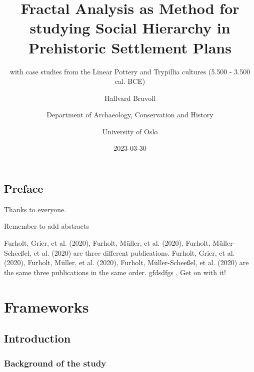 \documentclass[
  12pt,
]{book}
\title{Fractal Analysis as Method for studying Social Hierarchy in Prehistoric Settlement Plans}
\subtitle{with case studies from the Linear Pottery and Trypillia cultures (5.500 - 3.500 cal. BCE)}
\author{Hallvard Bruvoll \and Department of Archaeology, Conservation and History \and University of Oslo}
\date{2023-03-30}
\begin{document}
\maketitle

{
\setcounter{tocdepth}{1}
\tableofcontents
}
\hypertarget{preface}{%
\chapter*{Preface}\label{preface}}

Thanks to everyone.

Remember to add abstracts

Furholt, Grier, et al. (2020), Furholt, Müller, et al. (2020), Furholt, Müller-Scheeßel, et al. (2020) are three different publications. Furholt, Grier, et al. (2020), Furholt, Müller, et al. (2020), Furholt, Müller-Scheeßel, et al. (2020) are the same three publications in the same order. gfdsdfgs , Get on with it!

\hypertarget{part-frameworks}{%
\part{Frameworks}\label{part-frameworks}}

\hypertarget{intro}{%
\chapter{Introduction}\label{intro}}

\hypertarget{background-of-the-study}{%
\section{Background of the study}\label{background-of-the-study}}
\end{document}
